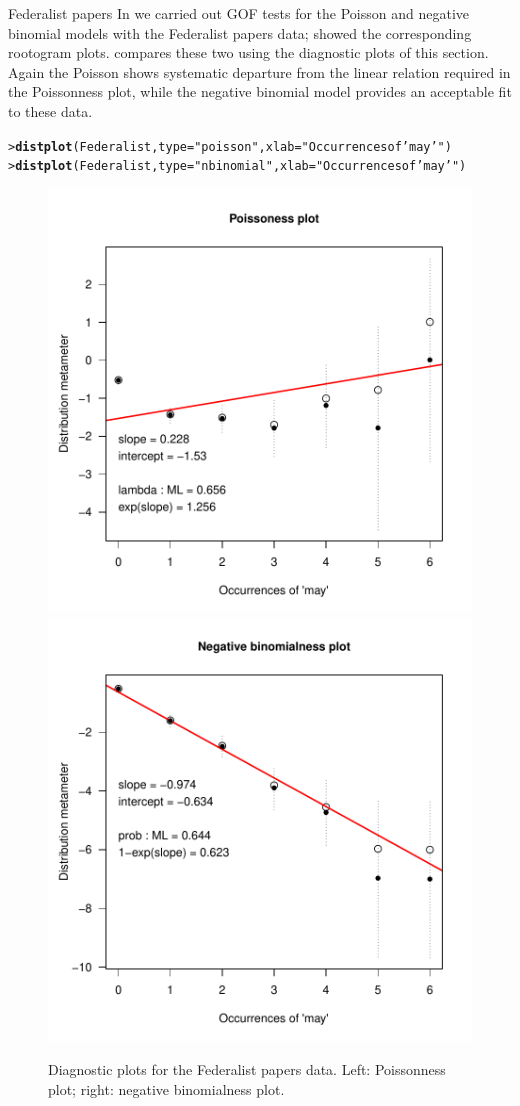 \documentclass[10pt,krantz2]{krantz}\usepackage[]{graphicx}\usepackage[]{color}
\makeatletter
\newcommand{\hlstr}[1]{\textcolor[rgb]{0.192,0.494,0.8}{#1}}%
\newcommand{\hlstd}[1]{\textcolor[rgb]{0.345,0.345,0.345}{#1}}%
\newcommand{\hlkwc}[1]{\textcolor[rgb]{0.333,0.667,0.333}{#1}}%
\newcommand{\hlkwd}[1]{\textcolor[rgb]{0.737,0.353,0.396}{\textbf{#1}}}%
\newenvironment{kframe}{%
 \def\at@end@of@kframe{}%
 \ifinner\ifhmode%
  \def\at@end@of@kframe{\end{minipage}}%
  \begin{minipage}{\columnwidth}%
 \fi\fi%
 \def\FrameCommand##1{\hskip\@totalleftmargin \hskip-\fboxsep
 \colorbox{shadecolor}{##1}\hskip-\fboxsep
     \hskip-\linewidth \hskip-\@totalleftmargin \hskip\columnwidth}%
 \MakeFramed {\advance\hsize-\width
   \@totalleftmargin\z@ \linewidth\hsize
   \@setminipage}}%
 {\par\unskip\endMakeFramed%
 \at@end@of@kframe}
\newenvironment{knitrout}{}{} %
\renewenvironment{knitrout}{\small\renewcommand{\baselinestretch}{.85}}{} %
\makeatother
\begin{document}
\begin{Example}{Federalist papers}
In  we carried out GOF tests for the Poisson and
negative binomial models with the Federalist papers data;
 showed the corresponding rootogram plots.
 compares these two using the diagnostic plots of
this section. Again the Poisson shows systematic departure from the
linear relation required in the Poissonness plot, while the
negative binomial model provides an acceptable fit to
these data.
\begin{knitrout}
\color{fgcolor}\begin{kframe}
\begin{alltt}
\hlstd{> }\hlkwd{distplot}\hlstd{(Federalist,} \hlkwc{type} \hlstd{=} \hlstr{"poisson"}\hlstd{,} \hlkwc{xlab}\hlstd{=}\hlstr{"Occurrences of 'may'"}\hlstd{)}
\hlstd{> }\hlkwd{distplot}\hlstd{(Federalist,} \hlkwc{type} \hlstd{=} \hlstr{"nbinomial"}\hlstd{,} \hlkwc{xlab}\hlstd{=}\hlstr{"Occurrences of 'may'"}\hlstd{)}
\end{alltt}
\end{kframe}\begin{figure}[!htbp]

\centerline{\includegraphics[width=.49\textwidth]{ch03/fig/distplot5-1} 
\includegraphics[width=.49\textwidth]{ch03/fig/distplot5-2} }

\caption[Diagnostic plots for the Federalist papers data]{Diagnostic plots for the Federalist papers data. Left: Poissonness plot; right: negative binomialness plot.\label{fig:distplot5}}
\end{figure}


\end{knitrout}
\end{Example}
\end{document}
